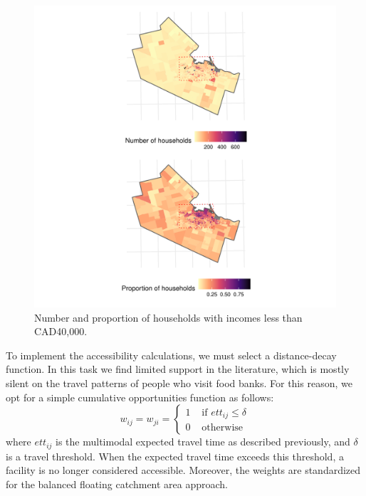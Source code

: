 \documentclass[]{elsarticle} %
\begin{document}
\begin{figure}
\includegraphics[width=1\linewidth]{Accessibility-Foodbanks-Hamilton-V0_files/figure-latex/plot-low-income-households-1} \caption{\label{fig:low-income-households}Number and proportion of households with incomes less than CAD40,000.}\label{fig:plot-low-income-households}
\end{figure}

To implement the accessibility calculations, we must select a
distance-decay function. In this task we find limited support in the
literature, which is mostly silent on the travel patterns of people who
visit food banks. For this reason, we opt for a simple cumulative
opportunities function as follows: \[
w_{ij}=w_{ji}=
\begin{cases}
1 & \text{ if } ett_{ij}\le \delta\\
0 & \text{ otherwise}
\end{cases}
\] \noindent where \(ett_{ij}\) is the multimodal expected travel time
as described previously, and \(\delta\) is a travel threshold. When the
expected travel time exceeds this threshold, a facility is no longer
considered accessible. Moreover, the weights are standardized for the
balanced floating catchment area approach.
\end{document}
